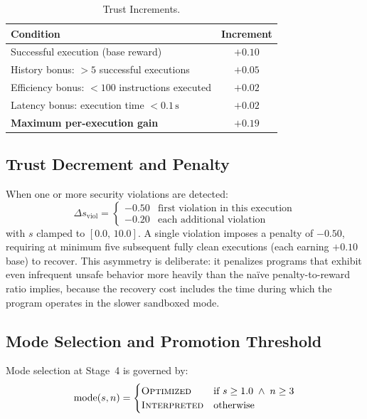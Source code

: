 \documentclass[conference]{IEEEtran}
\begin{document}
\begin{table}[t]
\caption{Trust Increments.}
\label{tab:increment}
\centering
\renewcommand{\arraystretch}{1.18}
\small
\begin{tabular}{@{} p{4.3cm} c @{}}
\toprule
\textbf{Condition} & \textbf{Increment} \\
\midrule
Successful execution (base reward)               & $+0.10$ \\
History bonus: $> 5$ successful executions       & $+0.05$ \\
Efficiency bonus: $<\!100$ instructions executed & $+0.02$ \\
Latency bonus: execution time $<\!0.1\,\text{s}$& $+0.02$ \\
\midrule
\textbf{Maximum per-execution gain}              & $\mathbf{+0.19}$\\
\bottomrule
\end{tabular}
\end{table}

\subsection{Trust Decrement and Penalty}

When one or more security violations are detected:
\begin{equation}
  \Delta s_{\text{viol}} =
  \begin{cases}
    -0.50 & \text{first violation in this execution} \\
    -0.20 & \text{each additional violation}
  \end{cases}
  \label{eq:penalty}
\end{equation}
with $s$ clamped to $[0.0,\,10.0]$. A single violation imposes a
penalty of $-0.50$, requiring at minimum five subsequent fully clean
executions (each earning $+0.10$ base) to recover. This asymmetry
is deliberate: it penalizes programs that exhibit even infrequent
unsafe behavior more heavily than the na\"ive penalty-to-reward ratio
implies, because the recovery cost includes the time during which
the program operates in the slower sandboxed mode.

\subsection{Mode Selection and Promotion Threshold}

Mode selection at Stage~4 is governed by:
\begin{equation}
  \text{mode}(s, n) =
  \begin{cases}
    \textsc{Optimized}   & \text{if } s \geq 1.0 \;\wedge\; n \geq 3 \\
    \textsc{Interpreted} & \text{otherwise}
  \end{cases}
  \label{eq:mode}
\end{equation}
\end{document}
